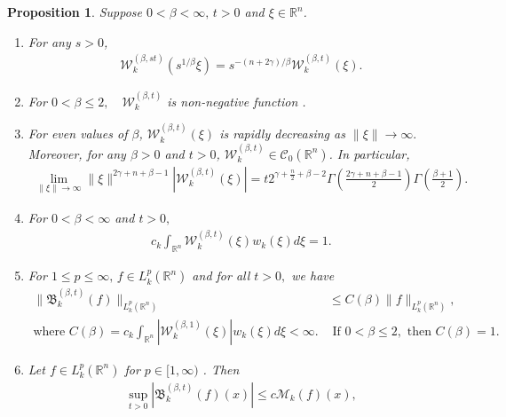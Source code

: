 \documentclass[11pt,a4paper,reqno]{amsproc}
\newtheorem{proposition}[theorem]{Proposition}
\theoremstyle{definition}
\theoremstyle{remark}
\numberwithin{equation}{section}
\begin{document}
\begin{proposition} \label{Proposition-main}
      Suppose $ 0<\beta <\infty, \, t>0$ and $\xi \in \mathbb{R}^n$. 
      \begin{enumerate}[$(i)$]
          \item For any $s>0$, 
          \begin{align*}
              \mathcal{W}_k^{(\beta, s t)}(s^{1/\beta}\xi) = s^{-(n+2\gamma)/\beta}\mathcal{W}_k^{(\beta, t)}(\xi).  
          \end{align*} 
          \item  For $0<\beta \le 2, \quad \mathcal{W}_k^{(\beta, t)}$ is non-negative function .\\
          \item For  even values of $\beta$, $\mathcal{W}_k^{(\beta, t)}(\xi)$ is rapidly decreasing as $\|\xi\|\rightarrow \infty.$ Moreover, for any $\beta>0$ and $t>0$, $\mathcal{W}_k^{(\beta, t)}\in \mathcal{C}_0(\mathbb{R}^n)$. In particular, 
          \begin{align} \label{Pro-Main-3}
              \lim_{\|\xi\| \rightarrow \infty} \|\xi\|^{2\gamma+n+\beta-1}\left|\mathcal{W}_k^{(\beta, t)}(\xi)\right|= t2^{\gamma+\frac{n}{2}+\beta-2} \Gamma \left( \frac{2\gamma+n+\beta-1}{2} \right) \Gamma\left( \frac{\beta+1}{2} \right).
          \end{align}
          \item For $0<\beta <\infty$ and $t>0,$ 
          \begin{align*}
               c_k\int_{\mathbb{R}^n} \mathcal{W}_k^{(\beta, t)}(\xi)w_k(\xi)d\xi =1.
          \end{align*}
          \item For $1\le p \le \infty, \, f \in L_k^p(\mathbb{R}^n)$ and for all $t>0,$ we have
          \begin{align}
              \| \mathfrak{B}_k^{(\beta,t)}(f) \|_{L_k^p(\mathbb{R}^n)} &\le C({\beta}) \|f\|_{L_k^p(\mathbb{R}^n)}, \label{prop-main-5-0}\\
          \text{where } C({\beta})= c_k \int_{\mathbb{R}^n} |\mathcal{W}_k^{(\beta,1)}(\xi)|w_k(\xi)d\xi <\infty. & \text{ If } 0< \beta \le 2, \text{ then } C({\beta})=1.
        \label{prop-main-5}  \end{align}
          \item Let $ f \in L_k^p(\mathbb{R}^n)$  for $p \in [1,\infty) $  . Then  
          \begin{align} \label{Pro.Main-6}
              \sup_{t>0}|\mathfrak{B}_k^{(\beta,t)}(f)(x)| \le c\mathcal{M}_k(f)(x),

\end{align}
\end{enumerate}
\end{proposition}
\end{document}
